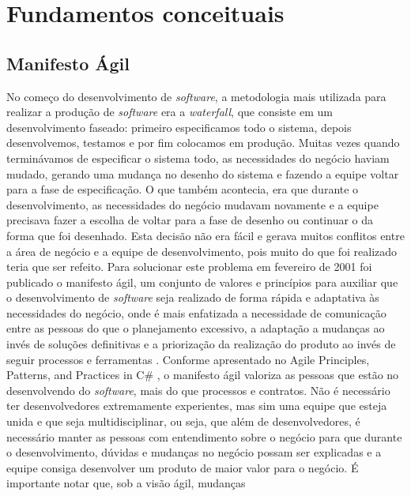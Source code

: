 \part{Fundamentos conceituais}
  \chapter{Manifesto Ágil}
    No começo do desenvolvimento de \textit{software}, a metodologia mais utilizada
    para realizar a produção de \textit{software} era a \textit{waterfall}, que
    consiste em um desenvolvimento faseado: primeiro especificamos todo o sistema,
    depois desenvolvemos, testamos e por fim colocamos em produção. Muitas vezes
    quando terminávamos de especificar o sistema todo, as necessidades do
    negócio haviam mudado, gerando uma mudança no desenho do sistema e fazendo a
    equipe voltar para a fase de especificação. O que também acontecia, era que
    durante o desenvolvimento, as necessidades do negócio mudavam novamente e
    a equipe precisava fazer a escolha de voltar para a fase de desenho ou continuar
    o da forma que foi desenhado. Esta decisão não era fácil e gerava muitos conflitos
    entre a área de negócio e a equipe de desenvolvimento, pois muito do que foi
    realizado teria que ser refeito. \newline
    Para solucionar este problema em fevereiro de 2001 foi publicado o manifesto
    ágil, um conjunto de valores e princípios para auxiliar que o desenvolvimento de
    \textit{software} seja realizado de forma rápida e adaptativa às necessidades
    do negócio, onde é mais enfatizada a necessidade de comunicação entre as pessoas
    do que o planejamento excessivo, a adaptação a mudanças ao invés de soluções
    definitivas e a priorização da realização do produto ao invés de seguir processos
    e ferramentas \cite{manifestoAgile}. \newline
    Conforme apresentado no Agile Principles, Patterns, and Practices in C\#
    \cite{martin2007agile}, o manifesto ágil valoriza as pessoas que estão
    no desenvolvendo do \textit{software}, mais do que processos e contratos.
    Não é necessário ter desenvolvedores extremamente experientes, mas sim
    uma equipe que esteja unida e que seja multidisciplinar, ou seja, que além de
    desenvolvedores, é necessário manter as pessoas com entendimento sobre o
    negócio para que durante o desenvolvimento, dúvidas e mudanças no negócio
    possam ser explicadas e a equipe consiga desenvolver um produto de maior
    valor para o negócio. É importante notar que, sob a visão ágil, mudanças

